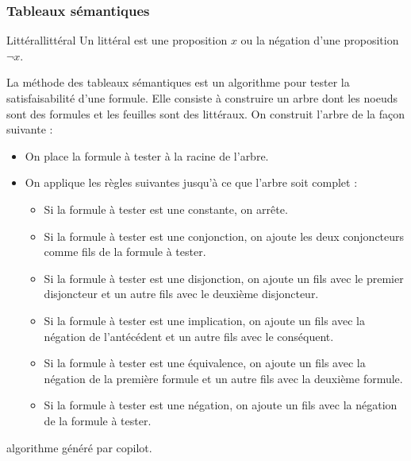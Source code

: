 \subsubsection{Tableaux sémantiques}
\begin{definition}{Littéral}{littéral}
  Un littéral est une proposition $x$ ou la négation d'une proposition $\neg x$.
\end{definition}
La méthode des tableaux sémantiques est un algorithme pour tester la satisfaisabilité d'une formule. Elle consiste à construire un arbre dont les noeuds sont des formules et les feuilles sont des littéraux. On construit l'arbre de la façon suivante :
\begin{itemize}[label=$\bullet$]
  \item On place la formule à tester à la racine de l'arbre.
  \item On applique les règles suivantes jusqu'à ce que l'arbre soit complet :
  \begin{itemize}[label=$\circ$]
    \item Si la formule à tester est une constante, on arrête.
    \item Si la formule à tester est une conjonction, on ajoute les deux conjoncteurs comme fils de la formule à tester.
    \item Si la formule à tester est une disjonction, on ajoute un fils avec le premier disjoncteur et un autre fils avec le deuxième disjoncteur.
    \item Si la formule à tester est une implication, on ajoute un fils avec la négation de l'antécédent et un autre fils avec le conséquent.
    \item Si la formule à tester est une équivalence, on ajoute un fils avec la négation de la première formule et un autre fils avec la deuxième formule.
    \item Si la formule à tester est une négation, on ajoute un fils avec la négation de la formule à tester.
  \end{itemize}
\end{itemize}
\begin{remark}
  algorithme généré par copilot.
\end{remark}